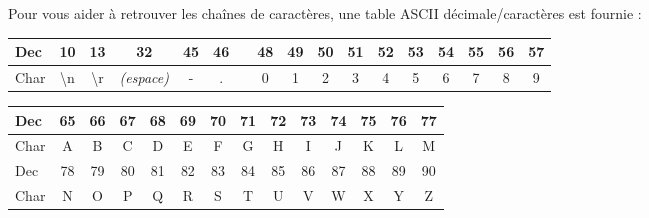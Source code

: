 \documentclass[11pt,a4paper]{article}
\begin{document}

\noindent Pour vous aider à retrouver les chaînes de caractères, une table ASCII décimale/caractères est fournie :

\begin{center}
\begin{tabular}{ | l |c|c|c|c|c| c |c|c|c|c|c|c|c|c|c|c| }
\hline
Dec &         10         &        13         &         32        & 45 & 46 &   & 48 & 49 & 50 & 51 & 52 & 53 & 54 & 55 & 56 & 57 \\
\hline
Char & \textbackslash{}n & \textbackslash{}r & \textit{(espace)} &  - &  . &   & 0 &  1 &  2 &  3 &  4 &  5 &  6 &  7 &  8 &  9 \\
\hline
\end{tabular}

\medskip


\begin{tabular}{ | l |c|c|c|c|c|c|c|c|c|c|c|c|c| }
\hline
Dec &  65 & 66 & 67 & 68 & 69 & 70 & 71 & 72 & 73 & 74 & 75 & 76 & 77 \\
\hline
Char &  A &  B &  C &  D &  E &  F &  G &  H &  I &  J &  K &  L &  M \\
\hline
%
%
\hline
Dec &  78 & 79 & 80 & 81 & 82 & 83 & 84 & 85 & 86 & 87 & 88 & 89 & 90 \\
\hline
Char &  N &  O &  P &  Q &  R &  S &  T &  U &  V &  W &  X &  Y &  Z \\
\hline
\end{tabular}


\medskip


\end{center}
\end{document}
